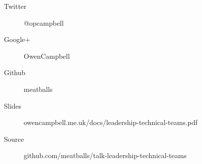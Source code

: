 

\begin{frame}{}
  \begin{description}
    \item [Twitter] @opcampbell
    \item [Google+] OwenCampbell
    \item [Github] meatballs
  \end{description}
  \vfill
  \begin{description}
    \item [Slides] {\small owencampbell.me.uk/docs/leadership-technical-teams.pdf}
    \item [Source] {\small github.com/meatballs/talk-leadership-technical-teams}
  \end{description}

\end{frame}
